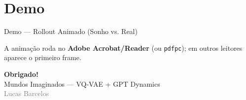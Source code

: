\documentclass[11pt,aspectratio=169]{beamer}
\begin{document}
\section{Demo}

\begin{frame}{Demo --- Rollout Animado (Sonho vs. Real)}
  \centering

  \smallskip
  {\footnotesize A anima\c{c}\~ao roda no \textbf{Adobe Acrobat/Reader} (ou \texttt{pdfpc});
  em outros leitores aparece o primeiro frame.}
\end{frame}

\begin{frame}[plain]
  \centering
  \vfill
  {\LARGE\bfseries Obrigado!}\\[8pt]
  {\large Mundos Imaginados --- VQ-VAE + GPT Dynamics}\\[4pt]
  \textcolor{gray}{Lucas Barcelos}
  \vfill
\end{frame}
\end{document}
